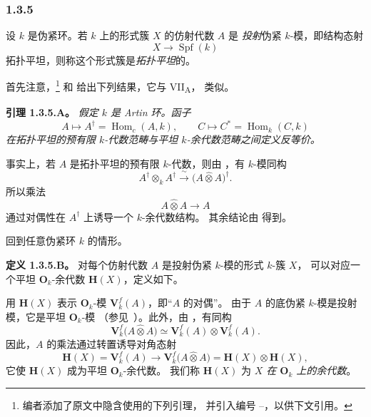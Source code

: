 
\subsubsection*{1.3.5}
\label{sga3:VIIB:1.3.5}

设 \(k\) 是伪紧环。若 \(k\) 上的形式簇 \(X\) 的仿射代数 \(A\) 是
\emph{投射}伪紧 \(k\)-模，即结构态射
\[
  X\longrightarrow\operatorname{Spf}(k)
\]
拓扑平坦，则称这个形式簇是\emph{拓扑平坦}的。

首先注意，\footnote{\label{sga3:VIIB:nde:60}编者添加了原文中隐含使用的下列引理，
并引入编号 --，以供下文引用。}
 和 
给出下列结果，它与 VII\textsubscript{A}， 类似。

\medskip
\noindent\textbf{引理 1.3.5.A。}
\label{sga3:VIIB:1.3.5.A}
{\itshape 假定 \(k\) 是 Artin 环。函子
\[
  A\longmapsto A^\dagger=\operatorname{Hom}_c(A,k),
  \qquad
  C\longmapsto C^*=\operatorname{Hom}_k(C,k)
\]
在拓扑平坦的预有限 \(k\)-代数范畴与平坦 \(k\)-余代数范畴之间定义反等价。}

事实上，若 \(A\) 是拓扑平坦的预有限 \(k\)-代数，则由
，有 \(k\)-模同构
\[
  A^\dagger\otimes_k A^\dagger
  \xrightarrow{\ \sim\ }
  \bigl(A\widehat{\otimes}A\bigr)^\dagger.
\]
所以乘法
\[
  A\widehat{\otimes}A\longrightarrow A
\]
通过对偶性在 \(A^\dagger\) 上诱导一个 \(k\)-余代数结构。
其余结论由 得到。

回到任意伪紧环 \(k\) 的情形。

\medskip
\noindent\textbf{定义 1.3.5.B。}
\label{sga3:VIIB:1.3.5.B}
对每个仿射代数 \(A\) 是投射伪紧 \(k\)-模的形式 \(k\)-簇 \(X\)，
可以对应一个平坦 \(\mathbf O_k\)-余代数 \(\mathbf H(X)\)，定义如下。

用 \(\mathbf H(X)\) 表示 \(\mathbf O_k\)-模 \(\mathbf V_k^f(A)\)，即“\(A\) 的对偶”。
由于 \(A\) 的底伪紧 \(k\)-模是投射模，它是平坦 \(\mathbf O_k\)-模
\textup{（参见\ ）}。此外，由
，有同构
\[
  \mathbf V_k^f\bigl(A\widehat{\otimes}A\bigr)
  \simeq
  \mathbf V_k^f(A)\otimes\mathbf V_k^f(A).
\]
因此，\(A\) 的乘法通过转置诱导对角态射
\[
  \mathbf H(X)=\mathbf V_k^f(A)
  \longrightarrow
  \mathbf V_k^f\bigl(A\widehat{\otimes}A\bigr)
  =\mathbf H(X)\otimes\mathbf H(X),
\]
它使 \(\mathbf H(X)\) 成为平坦 \(\mathbf O_k\)-余代数。
我们称 \(\mathbf H(X)\) 为 \emph{\(X\) 在 \(\mathbf O_k\) 上的余代数}。

